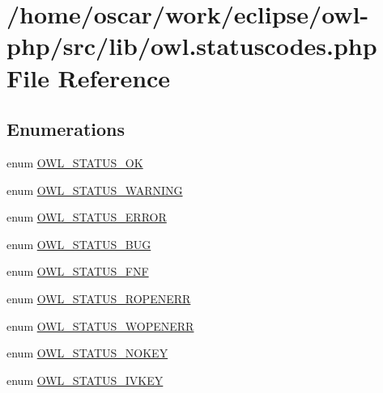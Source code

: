 \hypertarget{owl_8statuscodes_8php}{
\section{/home/oscar/work/eclipse/owl-php/src/lib/owl.statuscodes.php File Reference}
\label{owl_8statuscodes_8php}
}
\subsection*{Enumerations}
\begin{Indent}{\bf }\par
\begin{CompactItemize}
\item 
enum \hyperlink{owl_8statuscodes_8php_8bbae521b65a3416f22e2879c911de3f}{OWL\_\-STATUS\_\-OK} 
\item 
enum \hyperlink{owl_8statuscodes_8php_783f6a33a00386bc20447487bc76c94e}{OWL\_\-STATUS\_\-WARNING} 
\item 
enum \hyperlink{owl_8statuscodes_8php_b00c7cf8190cde5630604617b408ce71}{OWL\_\-STATUS\_\-ERROR} 
\item 
enum \hyperlink{owl_8statuscodes_8php_d3a24b224b20a07e626894d7da745455}{OWL\_\-STATUS\_\-BUG} 
\item 
enum \hyperlink{owl_8statuscodes_8php_3e17ae43daac1a9847afaf18ae02b5f6}{OWL\_\-STATUS\_\-FNF} 
\item 
enum \hyperlink{owl_8statuscodes_8php_b67c4e6fe36a5f763d59e49ee1395a6e}{OWL\_\-STATUS\_\-ROPENERR} 
\item 
enum \hyperlink{owl_8statuscodes_8php_9d2015fb92c189204f143b637398f40c}{OWL\_\-STATUS\_\-WOPENERR} 
\item 
enum \hyperlink{owl_8statuscodes_8php_3b2d7ec8e84f7022afe7dc2c9f96e964}{OWL\_\-STATUS\_\-NOKEY} 
\item 
enum \hyperlink{owl_8statuscodes_8php_c0fd62708c370d17b251339d38cc92ca}{OWL\_\-STATUS\_\-IVKEY} 
\end{CompactItemize}
\end{Indent}
